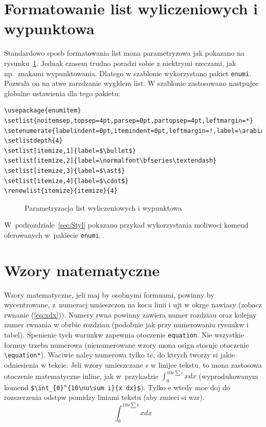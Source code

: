 \section{Formatowanie list wyliczeniowych i wypunktowa}
Standardowo sposb formatowania list mona parametryzowa jak pokazano na rysunku~\ref{fig:listlay}. Jednak czasem trudno poradzi sobie z niektrymi rzeczami, jak np.~znakami wypunktowania. Dlatego w szablonie wykorzystano pakiet \texttt{enumi}. Pozwala on na atwe zarzdzanie wygldem list. W szablonie zastosowano nastpujce globalne ustawienia dla tego pakietu:
\begin{lstlisting}[basicstyle=\footnotesize\ttfamily]
\usepackage{enumitem} 
\setlist{noitemsep,topsep=4pt,parsep=0pt,partopsep=4pt,leftmargin=*} 
\setenumerate{labelindent=0pt,itemindent=0pt,leftmargin=!,label=\arabic*.} 
\setlistdepth{4} 
\setlist[itemize,1]{label=$\bullet$} 
\setlist[itemize,2]{label=\normalfont\bfseries\textendash}
\setlist[itemize,3]{label=$\ast$}
\setlist[itemize,4]{label=$\cdot$}
\renewlist{itemize}{itemize}{4}
\end{lstlisting}
\begin{figure}[b]
\centering
{}
\drawparameterstrue
\drawlist
\caption{Parametryzacja list wyliczeniowych i wypunktowa}\label{fig:listlay}
\end{figure}

W~podrozdziale~\ref{sec:Styl} pokazano przykad wykorzystania moliwoci komend oferowanych w~pakiecie \texttt{enumi}.

\section{Wzory matematyczne}
Wzory matematyczne, jeli maj by osobnymi formuami, powinny by wycentrowane, z~numeracj umieszczon na kocu linii i ujt w okrge nawiasy (zobacz rwnanie (\ref{eq:xdx})). Numery rwna powinny zawiera numer rozdziau oraz kolejny numer rwnania w obrbie rozdziau (podobnie jak przy numerowaniu rysunkw i tabel). Spenienie tych warunkw zapewnia otoczenie \verb?equation?. Nie wszystkie formuy trzeba numerowa (nienumerowane wzory mona osign stosujc otoczenie \verb?\equation*?). Waciwie naley numerowa tylko te, do ktrych tworzy si jakie odniesienia w tekcie. Jeli wzory umieszczane s w linijce tekstu, to mona zastosowa otoczenie matematyczne inline, jak w~przykadzie $\int_{0}^{10\nu\sum i}{x dx}$ (wyprodukowanym komend \verb?$\int_{0}^{10\nu\sum i}{x dx}$?). Tylko e wtedy moe doj do rozszerzenia odstpw pomidzy liniami tekstu (aby zmieci si wzr).
\begin{equation}\label{eq:xdx}
\int_{0}^{10\nu\sum i}{x dx}
\end{equation}
